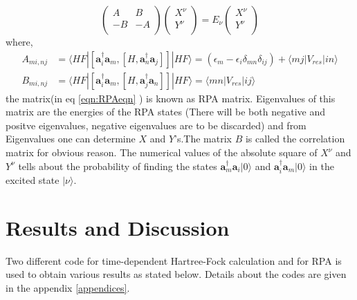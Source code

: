 \documentclass[a4paper]{paper}
\begin{document}
            \begin{equation} 
                \label{eqn:RPAeqn}
                \begin{pmatrix}
                    A&B\\
                    -B&-A\\
                \end{pmatrix} 
                \begin{pmatrix}
                    X^{\nu}\\
                    Y^{\nu}\\
                \end{pmatrix} = E_{\nu}
                \begin{pmatrix}
                    X^{\nu}\\
                    Y^{\nu}\\
                \end{pmatrix} 
            \end{equation}
            where,
            \begin{subequations}
            \begin{align}
                A_{mi,nj} &= \langle HF|\left[ \mathbf{a}^{\dagger}_{i} \mathbf{a}_{m},\left[H, \mathbf{a}^{\dagger}_{n} \mathbf{a}_{j}\right]\right]|HF\rangle = (\epsilon_{m}-\epsilon_{i}\delta_{mn}\delta_{ij}) + \langle mj|V_{res}|in\rangle    \\
                B_{mi,nj} &= \langle HF|\left[ \mathbf{a}^{\dagger}_{i} \mathbf{a}_{m},\left[H, \mathbf{a}^{\dagger}_{j} \mathbf{a}_{n}\right]\right]|HF\rangle = \langle mn|V_{res}|ij\rangle
            \end{align}
            \end{subequations}
            the matrix(in eq \ref{eqn:RPAeqn} ) is known as RPA matrix. Eigenvalues of this matrix are the energies of the RPA states (There will be both negative and positve eigenvalues, negative eigenvalues are to be discarded) and from Eigenvalues one can determine $X$ and $Y$'s.The matrix $B$ is called the correlation matrix for obvious reason. The numerical values of the absolute square of $X^{\nu}$ and $Y^{\nu}$ tells about the probability of finding the states $\mathbf{a}^{\dagger}_{m} \mathbf{a}_{i}|0\rangle$ and $\mathbf{a}^{\dagger}_{i} \mathbf{a}_{m}|0\rangle$ in the excited state $|\nu \rangle$.
        \section{Results and Discussion}
            Two different code for time-dependent Hartree-Fock calculation and for RPA is used to obtain various results as stated below. Details about the codes are given in the appendix \ref{appendices}. 
\end{document}
